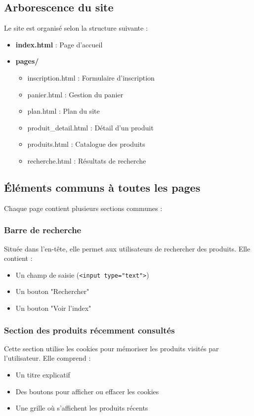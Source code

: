 \documentclass[12pt,a4paper]{article}
\begin{document}
\subsection{Arborescence du site}

Le site est organisé selon la structure suivante :

\begin{itemize}
\item \textbf{index.html} : Page d'accueil
\item \textbf{pages/}
  \begin{itemize}
  \item inscription.html : Formulaire d'inscription
  \item panier.html : Gestion du panier
  \item plan.html : Plan du site
  \item produit\_detail.html : Détail d'un produit
  \item produits.html : Catalogue des produits
  \item recherche.html : Résultats de recherche
  \end{itemize}
\end{itemize}

\subsection{Éléments communs à toutes les pages}

Chaque page contient plusieurs sections communes :

\subsubsection{Barre de recherche}
Située dans l'en-tête, elle permet aux utilisateurs de rechercher des produits. Elle contient :
\begin{itemize}
\item Un champ de saisie (\texttt{<input type="text">})
\item Un bouton "Rechercher"
\item Un bouton "Voir l'index"
\end{itemize}

\subsubsection{Section des produits récemment consultés}
Cette section utilise les cookies pour mémoriser les produits visités par l'utilisateur. Elle comprend :
\begin{itemize}
\item Un titre explicatif
\item Des boutons pour afficher ou effacer les cookies
\item Une grille où s'affichent les produits récents
\end{itemize}
\end{document}
